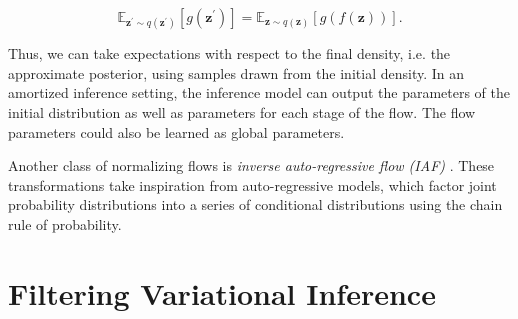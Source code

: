 \begin{equation}
	\mathbb{E}_{\mathbf{z}^\prime \sim q (\mathbf{z}^\prime)} \left[ g(\mathbf{z}^\prime) \right] = \mathbb{E}_{\mathbf{z} \sim q (\mathbf{z})} \left[ g( f (\mathbf{z})) \right].
\end{equation}

\noindent Thus, we can take expectations with respect to the final density, i.e. the approximate posterior, using samples drawn from the initial density. In an amortized inference setting, the inference model can output the parameters of the initial distribution as well as parameters for each stage of the flow. The flow parameters could also be learned as global parameters.


Another class of normalizing flows is \textit{inverse auto-regressive flow (IAF)} \cite{kingma2016improved}. These transformations take inspiration from auto-regressive models, which factor joint probability distributions into a series of conditional distributions using the chain rule of probability.


\section{Filtering Variational Inference}
\label{sec: variational inference in dynamical models}

